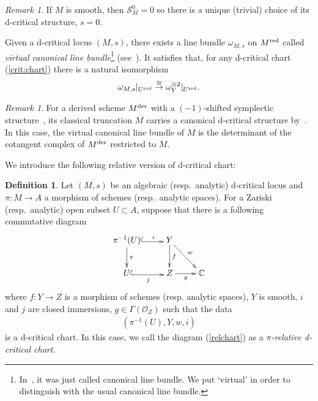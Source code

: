 \documentclass[11pt]{amsart}
\theoremstyle{plain}
\theoremstyle{definition}
\newtheorem{defi}[thm]{Definition}
\theoremstyle{remark}
\newtheorem{rmk}[thm]{Remark}
\newcommand{\oO}{\mathcal{O}}
\newcommand{\sS}{\mathcal{S}}
\begin{document}
\begin{rmk}\label{rmk:smooth}
If $M$ is smooth, then $\sS_M^0=0$ so there is a 
unique (trivial) choice of its d-critical structure, $s=0$. 
\end{rmk}

Given a d-critical locus $(M, s)$, there exists a line bundle
$\omega_{M, s}$ on $M^{\rm{red}}$
called \textit{virtual canonical line bundle}\footnote{In~\cite[Section~2.4]{JoyceD}, it was just called canonical line bundle. We put `virtual' in order to 
distinguish with the usual canonical line bundle.}
(see~\cite[Section~2.4]{JoyceD}). 
It satisfies that, 
for any
d-critical chart (\ref{crit:chart})
there is a natural isomorphism 
\begin{align}\label{nat:K0}
\omega_{M, s}|_{U^{\rm{red}}} \stackrel{\cong}{\to} 
\omega_Y^{\otimes 2}|_{U^{\rm{red}}}. 
\end{align}

\begin{rmk}\label{rmk:shifted}
For a derived scheme $M^{\rm{der}}$ with a $(-1)$-shifted 
symplectic structure~\cite{PTVV}, its classical 
truncation $M$ carries a canonical d-critical structure by~\cite{MR3352237}. 
In this case, the virtual canonical line bundle of $M$
is the determinant of  the cotangent complex of $M^{\rm{der}}$ restricted to $M$. 
\end{rmk}

We introduce the following relative version of 
d-critical chart: 
\begin{defi}\label{defi:relchart}
Let $(M, s)$ be an algebraic (resp.~analytic)
d-critical locus and 
$\pi \colon 
M \to A$ a morphism of schemes (resp.~analytic spaces). 
For a Zariski (resp.~analytic) open subset $U \subset A$, suppose that 
there is a following commutative diagram
\begin{align}\label{relchart}
\xymatrix{
\pi^{-1}(U) \ar[d]^-{\pi}
 \ar@<-0.3ex>@{^{(}->}[r]^-{i} & Y \ar[d]^-{f} \ar[rd]^-{w} \\
U \ar@<-0.3ex>@{^{(}->}[r]_-{j} & Z \ar[r]_-{g} & \mathbb{C}
}
\end{align}
where $f \colon Y \to Z$ is a morphism of schemes (resp. analytic spaces), 
$Y$ is smooth, $i$ and $j$ are closed immersions, $g \in \Gamma(\oO_Z)$
 such that the data
 \begin{align*}
 (\pi^{-1}(U), Y, w, i)
 \end{align*}
  is a d-critical chart. 
In this case, we call the diagram (\ref{relchart}) as a
\textit{$\pi$-relative d-critical chart}.  
\end{defi}
\end{document}
